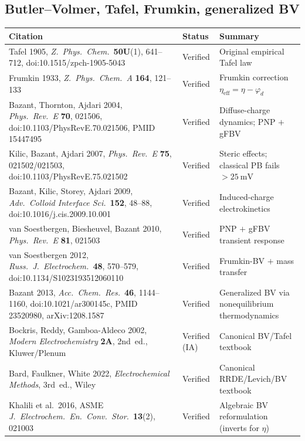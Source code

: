 \documentclass[11pt]{article}
\begin{document}
\subsection{Butler--Volmer, Tafel, Frumkin, generalized BV}

\begingroup
\small
\setlength{\tabcolsep}{4pt}
\renewcommand{\arraystretch}{1.2}
\begin{longtable}{@{}p{} p{} p{}@{}}
\toprule
\textbf{Citation} & \textbf{Status} & \textbf{Summary} \\
\midrule
\endhead
Tafel 1905, \emph{Z.~Phys.~Chem.}\ \textbf{50U}(1), 641--712,
doi:10.1515/zpch-1905-5043 &
Verified &
Original empirical Tafel law \\
Frumkin 1933, \emph{Z.~Phys.~Chem.~A} \textbf{164}, 121--133 &
Verified &
Frumkin correction $\eta_{\mathrm{eff}}=\eta-\varphi_d$ \\
Bazant, Thornton, Ajdari 2004, \emph{Phys.~Rev.~E} \textbf{70}, 021506,
doi:10.1103/PhysRevE.70.021506, PMID 15447495 &
Verified &
Diffuse-charge dynamics; PNP $+$ gFBV \\
Kilic, Bazant, Ajdari 2007, \emph{Phys.~Rev.~E} \textbf{75}, 021502/021503,
doi:10.1103/PhysRevE.75.021502 &
Verified &
Steric effects; classical PB fails $>\SI{25}{\milli\volt}$ \\
Bazant, Kilic, Storey, Ajdari 2009, \emph{Adv.~Colloid Interface Sci.}\
\textbf{152}, 48--88, doi:10.1016/j.cis.2009.10.001 &
Verified &
Induced-charge electrokinetics \\
van Soestbergen, Biesheuvel, Bazant 2010, \emph{Phys.~Rev.~E} \textbf{81},
021503 &
Verified &
PNP $+$ gFBV transient response \\
van Soestbergen 2012, \emph{Russ.~J.~Electrochem.}\ \textbf{48}, 570--579,
doi:10.1134/S1023193512060110 &
Verified &
Frumkin-BV $+$ mass transfer \\
Bazant 2013, \emph{Acc.~Chem.~Res.}\ \textbf{46}, 1144--1160,
doi:10.1021/ar300145c, PMID 23520980, arXiv:1208.1587 &
Verified &
Generalized BV via nonequilibrium thermodynamics \\
Bockris, Reddy, Gamboa-Aldeco 2002, \emph{Modern Electrochemistry} \textbf{2A},
2nd~ed., Kluwer/Plenum &
Verified (IA) &
Canonical BV/Tafel textbook \\
Bard, Faulkner, White 2022, \emph{Electrochemical Methods}, 3rd~ed., Wiley &
Verified &
Canonical RRDE/Levich/BV textbook \\
Khalili et al.\ 2016, ASME \emph{J.~Electrochem.~En.~Conv.~Stor.}\
\textbf{13}(2), 021003 &
Verified &
Algebraic BV reformulation (inverts for $\eta$) \\
\bottomrule
\end{longtable}
\endgroup
\end{document}
